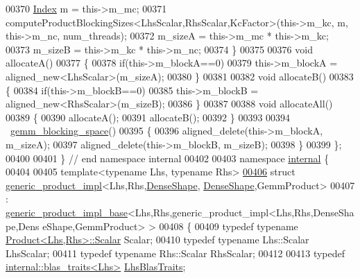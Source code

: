 \begin{DoxyCode}
00370       \hyperlink{namespace_eigen_a62e77e0933482dafde8fe197d9a2cfde}{Index} m = this->m\_mc;
00371       computeProductBlockingSizes<LhsScalar,RhsScalar,KcFactor>(this->m\_kc, m, this->m\_nc, num\_threads);
00372       m\_sizeA = this->m\_mc * this->m\_kc;
00373       m\_sizeB = this->m\_kc * this->m\_nc;
00374     \}
00375 
00376     \textcolor{keywordtype}{void} allocateA()
00377     \{
00378       \textcolor{keywordflow}{if}(this->m\_blockA==0)
00379         this->m\_blockA = aligned\_new<LhsScalar>(m\_sizeA);
00380     \}
00381 
00382     \textcolor{keywordtype}{void} allocateB()
00383     \{
00384       \textcolor{keywordflow}{if}(this->m\_blockB==0)
00385         this->m\_blockB = aligned\_new<RhsScalar>(m\_sizeB);
00386     \}
00387 
00388     \textcolor{keywordtype}{void} allocateAll()
00389     \{
00390       allocateA();
00391       allocateB();
00392     \}
00393 
00394     ~\hyperlink{class_eigen_1_1internal_1_1gemm__blocking__space}{gemm\_blocking\_space}()
00395     \{
00396       aligned\_delete(this->m\_blockA, m\_sizeA);
00397       aligned\_delete(this->m\_blockB, m\_sizeB);
00398     \}
00399 \};
00400 
00401 \} \textcolor{comment}{// end namespace internal}
00402 
00403 \textcolor{keyword}{namespace }\hyperlink{namespaceinternal}{internal} \{
00404 
00405 \textcolor{keyword}{template}<\textcolor{keyword}{typename} Lhs, \textcolor{keyword}{typename} Rhs>
\hyperlink{struct_eigen_1_1internal_1_1generic__product__impl_3_01_lhs_00_01_rhs_00_01_dense_shape_00_01_def53e16cb724bbb32f6918835a9970bd5}{00406} \textcolor{keyword}{struct }\hyperlink{struct_eigen_1_1internal_1_1generic__product__impl}{generic\_product\_impl}<Lhs,Rhs,\hyperlink{struct_eigen_1_1_dense_shape}{DenseShape},
      \hyperlink{struct_eigen_1_1_dense_shape}{DenseShape},GemmProduct>
00407   : \hyperlink{struct_eigen_1_1internal_1_1generic__product__impl__base}{generic\_product\_impl\_base}<Lhs,Rhs,generic\_product\_impl<Lhs,Rhs,DenseShape,Dens
      eShape,GemmProduct> >
00408 \{
00409   \textcolor{keyword}{typedef} \textcolor{keyword}{typename} \hyperlink{group___core___module_class_eigen_1_1_product}{Product<Lhs,Rhs>::Scalar} Scalar;
00410   \textcolor{keyword}{typedef} \textcolor{keyword}{typename} Lhs::Scalar LhsScalar;
00411   \textcolor{keyword}{typedef} \textcolor{keyword}{typename} Rhs::Scalar RhsScalar;
00412 
00413   \textcolor{keyword}{typedef} \hyperlink{struct_eigen_1_1internal_1_1blas__traits}{internal::blas\_traits<Lhs>} \hyperlink{struct_eigen_1_1internal_1_1blas__traits}{LhsBlasTraits};

\end{DoxyCode}
